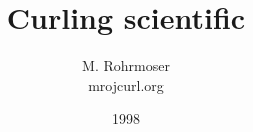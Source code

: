 \documentclass[a4paper,11pt,twoside]{report}
\title{Curling scientific}
\author{M. Rohrmoser\\{\small mro\symbol{64}jcurl.org}}
\begin{document}
\date{1998}
\maketitle
\tableofcontents
\listoffigures


\begin{appendix}
\end{appendix}


 \nocite{brach:92}
 \nocite{feynmanI:89}
 \nocite{gammert}
 \nocite{greinerII:85}
 \nocite{gross:95}
 \nocite{hertz:81}
 \nocite{hills:93}
 \nocite{hughesI:76}
 \nocite{hughesII:76}
 \nocite{lehmann:85}
 \nocite{meybergI:93}
 \nocite{van:89}
 \nocite{sutor:88}
 \nocite{denny:98}
 \nocite{shegelski:96}
 \nocite{voyenli:85}
 \nocite{voyenli:86}
 \nocite{daniels:86}
 \nocite{johnston:81}
\end{document}
